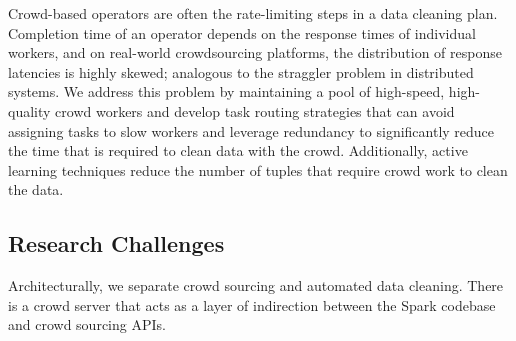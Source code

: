 
Crowd-based operators are often the rate-limiting steps in a data cleaning plan.
Completion time of an operator depends on the response times of individual workers, and on real-world crowdsourcing 
platforms, the distribution of response latencies is highly skewed; analogous to the straggler problem in distributed systems.
We address this problem by maintaining a pool of high-speed, high-quality crowd workers and develop task routing strategies 
that can avoid assigning tasks to slow workers and leverage redundancy to significantly reduce the time that is required to clean 
data with the crowd. Additionally, active learning techniques reduce the number of tuples that require crowd work to clean the
data.

\vspace{-0.25cm}


\iffalse
\subsection{Research Challenges}

Architecturally, we separate crowd sourcing and automated data cleaning.
There is a crowd server that acts as a layer of indirection between the Spark codebase and crowd sourcing APIs.


